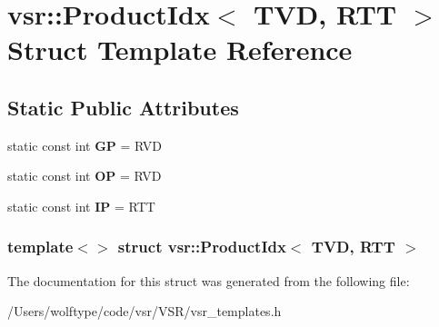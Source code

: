 \hypertarget{structvsr_1_1_product_idx_3_01_t_v_d_00_01_r_t_t_01_4}{\section{vsr\-:\-:Product\-Idx$<$ T\-V\-D, R\-T\-T $>$ Struct Template Reference}
\label{structvsr_1_1_product_idx_3_01_t_v_d_00_01_r_t_t_01_4}
}
\subsection*{Static Public Attributes}
\begin{DoxyCompactItemize}
\item 
\hypertarget{structvsr_1_1_product_idx_3_01_t_v_d_00_01_r_t_t_01_4_a70d40809185e355febf949a2e2f8180f}{static const int {\bfseries G\-P} = R\-V\-D}\label{structvsr_1_1_product_idx_3_01_t_v_d_00_01_r_t_t_01_4_a70d40809185e355febf949a2e2f8180f}

\item 
\hypertarget{structvsr_1_1_product_idx_3_01_t_v_d_00_01_r_t_t_01_4_a09a7202f41fee1265b696bc9738a534c}{static const int {\bfseries O\-P} = R\-V\-D}\label{structvsr_1_1_product_idx_3_01_t_v_d_00_01_r_t_t_01_4_a09a7202f41fee1265b696bc9738a534c}

\item 
\hypertarget{structvsr_1_1_product_idx_3_01_t_v_d_00_01_r_t_t_01_4_a5bcd39c035181223589131fec621fee9}{static const int {\bfseries I\-P} = R\-T\-T}\label{structvsr_1_1_product_idx_3_01_t_v_d_00_01_r_t_t_01_4_a5bcd39c035181223589131fec621fee9}

\end{DoxyCompactItemize}
\subsubsection*{template$<$$>$ struct vsr\-::\-Product\-Idx$<$ T\-V\-D, R\-T\-T $>$}



The documentation for this struct was generated from the following file\-:\begin{DoxyCompactItemize}
\item 
/\-Users/wolftype/code/vsr/\-V\-S\-R/vsr\-\_\-templates.\-h\end{DoxyCompactItemize}
